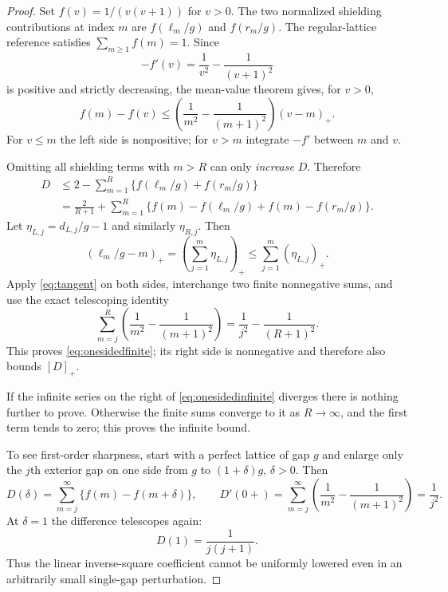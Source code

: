 \begin{proof}
Set $f(v)=1/(v(v+1))$ for $v>0$.
The two normalized shielding contributions
at index $m$ are $f(\ell_m/g)$ and $f(r_m/g)$.
The regular-lattice reference satisfies
$\sum_{m\ge1}f(m)=1$.
Since
\[
-f'(v)=\frac1{v^2}-\frac1{(v+1)^2}
\]
is positive and strictly decreasing,
the mean-value theorem gives, for $v>0$,
\begin{equation}\label{eq:tangent}
f(m)-f(v)\le
\left(\frac1{m^2}-\frac1{(m+1)^2}\right)
(v-m)_+.
\end{equation}
For $v\le m$ the left side is nonpositive;
for $v>m$ integrate $-f'$ between $m$ and $v$.

Omitting all shielding terms with $m>R$ can
only \emph{increase} $D$. Therefore
\begin{align*}
D
&\le 2-\sum_{m=1}^R
\{f(\ell_m/g)+f(r_m/g)\}\\
&=\frac2{R+1}+
\sum_{m=1}^R
\{f(m)-f(\ell_m/g)+f(m)-f(r_m/g)\}.
\end{align*}
Let $\eta_{L,j}=d_{L,j}/g-1$ and similarly
$\eta_{R,j}$. Then
\[
(\ell_m/g-m)_+
=\left(\sum_{j=1}^m\eta_{L,j}\right)_+
\le\sum_{j=1}^m(\eta_{L,j})_+.
\]
Apply \eqref{eq:tangent} on both sides,
interchange two finite nonnegative sums, and use
the exact telescoping identity
\[
\sum_{m=j}^R
\left(\frac1{m^2}-\frac1{(m+1)^2}\right)
=\frac1{j^2}-\frac1{(R+1)^2}.
\]
This proves \eqref{eq:onesidedfinite};
its right side is nonnegative and therefore
also bounds $[D]_+$.

If the infinite series on the right of
\eqref{eq:onesidedinfinite} diverges there
is nothing further to prove. Otherwise
the finite sums converge to it as $R\to\infty$,
and the first term tends to zero; this proves
the infinite bound.

To see first-order sharpness,
start with a perfect lattice of gap $g$
and enlarge only the $j$th exterior gap on
one side from $g$ to $(1+\delta)g$,
$\delta>0$. Then
\[
D(\delta)=\sum_{m=j}^\infty
\{f(m)-f(m+\delta)\},\qquad
D'(0+)=\sum_{m=j}^\infty
\left(\frac1{m^2}-\frac1{(m+1)^2}\right)
=\frac1{j^2}.
\]
At $\delta=1$ the difference telescopes again:
\[
D(1)=\frac1{j(j+1)}.
\]
Thus the linear inverse-square coefficient
cannot be uniformly lowered even in
an arbitrarily small single-gap perturbation.
\end{proof}

